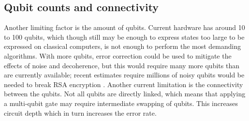 \subsection{Qubit counts and connectivity}
Another limiting factor is the amount of qubits.
Current hardware has around 10 to 100 qubits, which though still may be enough to express states too large to be expressed on classical computers, is not enough to perform the most demanding algorithms.
With more qubits, error correction could be used to mitigate the effects of noise and decoherence, but this would require many more qubits than are currently available; recent estimates require millions of noisy qubits would be needed to break RSA encryption \cite{gidney2021}.
Another current limitation is the connectivity between the qubits.
Not all qubits are directly linked, which means that applying a multi-qubit gate may require intermediate swapping of qubits.
This increases circuit depth which in turn increases the error rate.